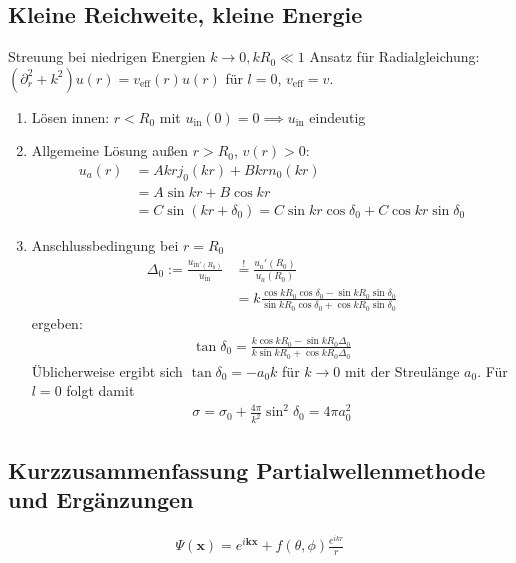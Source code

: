 \documentclass[11pt,a4paper]{report}
\begin{document}
\subsection{Kleine Reichweite, kleine Energie}

Streuung bei niedrigen Energien $k \rightarrow 0, k R_0 \ll 1$
Ansatz für Radialgleichung: $(\partial_r^2 + k^2) u(r) = v_{\mathrm{eff}}(r) u(r)$ für $l=0$, $v_{\mathrm{eff}} = v$.
\begin{enumerate}
    \item Lösen innen: $r < R_0$ mit $u_{\mathrm{in}}(0) = 0 \implies u_{\mathrm{in}}$ eindeutig 
    \item Allgemeine Lösung außen $r > R_0$, $v(r)>0$:
    \begin{align*}
        u_a(r) &= A k r j_0(k r) + B k r n_0(k r) \\
        &= A \sin k r + B \cos k r \\
        &= C \sin (k r + \delta_0) = C \sin kr \cos \delta_0 + C \cos kr \sin \delta_0
    \end{align*}
    \item Anschlussbedingung bei $r=R_0$
    \begin{align*}
        \Delta_0 := \frac{u_{\mathrm{in}'(R_0)}}{u_{\mathrm{in}}} &\stackrel{!}{=} \frac{u_a'(R_0)}{u_a(R_0)} \\ 
        &= k \frac{\cos k R_0 \cos \delta_0 - \sin k R_0 \sin \delta_0}{\sin k R_0 \cos \delta_0 + \cos k R_0 \sin \delta_0} 
    \end{align*}
    ergeben:
    \begin{align*}
        \tan \delta_0 = \frac{k \cos k R_0 - \sin k R_0 \Delta_0}{k \sin k R_0 + \cos k R_0 \Delta_0}
    \end{align*}
    Üblicherweise ergibt sich $\tan \delta_0 = -a_0 k$ für $k \rightarrow 0$ mit der Streulänge $a_0$.
    Für $l=0$ folgt damit 
    \begin{align*}
        \sigma = \sigma_0 + \frac{4\pi}{k^2} \sin^2 \delta_0 = 4 \pi a_0^2
    \end{align*}
\end{enumerate}

\subsection{Kurzzusammenfassung Partialwellenmethode und Ergänzungen}

\begin{align*}
    \Psi(\mathbf{x}) = e^{i \mathbf{k} \mathbf{x}} + f(\theta, \phi) \frac{e^{i k r}}{r}
\end{align*}
\end{document}
